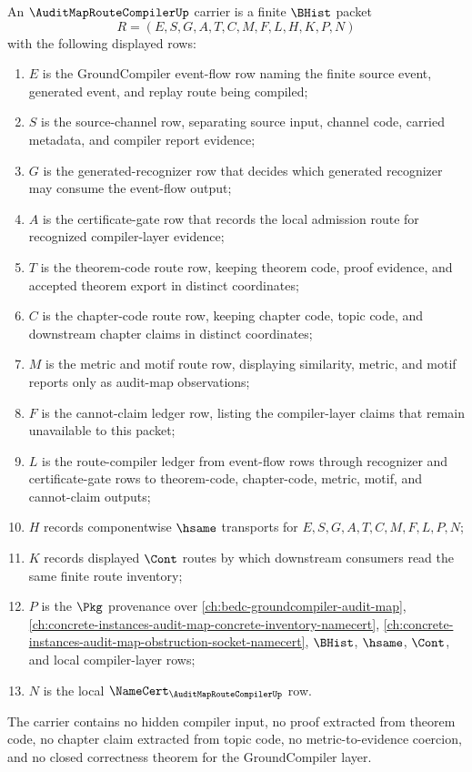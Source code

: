 \begin{definition}
\label{def:audit-map-route-compiler-carrier}
An $\AuditMapRouteCompilerUp$ carrier is a finite $\BHist$ packet
$$
R=(E,S,G,A,T,C,M,F,L,H,K,P,N)
$$
with the following displayed rows:
\begin{enumerate}
\item $E$ is the GroundCompiler event-flow row naming the finite source event, generated event, and replay route being compiled;
\item $S$ is the source-channel row, separating source input, channel code, carried metadata, and compiler report evidence;
\item $G$ is the generated-recognizer row that decides which generated recognizer may consume the event-flow output;
\item $A$ is the certificate-gate row that records the local admission route for recognized compiler-layer evidence;
\item $T$ is the theorem-code route row, keeping theorem code, proof evidence, and accepted theorem export in distinct coordinates;
\item $C$ is the chapter-code route row, keeping chapter code, topic code, and downstream chapter claims in distinct coordinates;
\item $M$ is the metric and motif route row, displaying similarity, metric, and motif reports only as audit-map observations;
\item $F$ is the cannot-claim ledger row, listing the compiler-layer claims that remain unavailable to this packet;
\item $L$ is the route-compiler ledger from event-flow rows through recognizer and certificate-gate rows to theorem-code, chapter-code, metric, motif, and cannot-claim outputs;
\item $H$ records componentwise $\hsame$ transports for $E,S,G,A,T,C,M,F,L,P,N$;
\item $K$ records displayed $\Cont$ routes by which downstream consumers read the same finite route inventory;
\item $P$ is the $\Pkg$ provenance over \autoref{ch:bedc-groundcompiler-audit-map}, \autoref{ch:concrete-instances-audit-map-concrete-inventory-namecert}, \autoref{ch:concrete-instances-audit-map-obstruction-socket-namecert}, $\BHist$, $\hsame$, $\Cont$, and local compiler-layer rows;
\item $N$ is the local $\NameCert_{\AuditMapRouteCompilerUp}$ row.
\end{enumerate}
The carrier contains no hidden compiler input, no proof extracted from theorem code, no chapter claim extracted from topic code, no metric-to-evidence coercion, and no closed correctness theorem for the GroundCompiler layer.
\end{definition}

